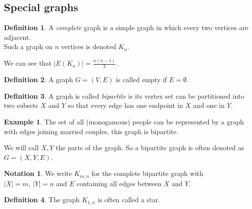 \documentclass{article}
\theoremstyle{definition}
\newtheorem*{defn}{Definition}
\newtheorem*{ex}{Example}
\newtheorem*{nota}{Notation}
\begin{document}
\subsection{Special graphs}
\begin{defn}
A \emph{complete} graph is a simple graph in which every two vertices are adjacent. \\
Such a graph on $n$ vertices is denoted $K_n$.
\end{defn}
\begin{center}
\end{center}

We can see that $|E(K_n)| = \frac{n(n-1)}{2}$.
\begin{defn}
A graph $G=(V,E)$ is called empty if $E=\emptyset$.
\end{defn}

\begin{defn}
A graph is called \emph{bipartite} is its vertex set can be partitioned into two subsets $X$ and $Y$ so that every edge has one endpoint in $X$ and one in $Y$.
\end{defn}

\begin{ex}
The set of all (monogamous) people can be represented by a graph with edges joining married couples, this graph is bipartite.
\end{ex}

We will call $X,Y$ the parts of the graph.
So a bipartite graph is often denoted as $G = (X,Y,E)$.
\begin{nota}
We write $K_{m,n}$ for the complete bipartite graph with $|X| = m,\ |Y| = n$ and $E$ containing all edges between $X$ and $Y$.
\end{nota}

\begin{defn}
The graph $K_{1,n}$ is often called a star.
\end{defn}
\begin{center}
\end{center}
\end{document}
